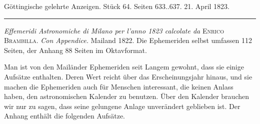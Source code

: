 \clearpage
{}
\begin{center}\small Göttingische gelehrte Anzeigen. Stück 64. Seiten 633..637. 21. April 1823.\\[3pt]\rule{.72\linewidth}{.3pt}\end{center}

\emph{Effemeridi Astronomiche di Milano per l'anno \textup{1823} calcolate da} \textsc{Enrico Brambilla}. \emph{Con Appendice.} Mailand 1822. Die Ephemeriden selbst umfassen 112 Seiten, der Anhang 88 Seiten im Oktavformat.

Man ist von den Mailänder Ephemeriden seit Langem gewohnt, dass sie einige Aufsätze enthalten. Deren Wert reicht über das Erscheinungsjahr hinaus, und sie machen die Ephemeriden auch für Menschen interessant, die keinen Anlass haben, den astronomischen Kalender zu benutzen.
Über den Kalender brauchen wir nur zu sagen, dass seine gelungene Anlage unverändert geblieben ist. Der Anhang enthält die folgenden Aufsätze.

